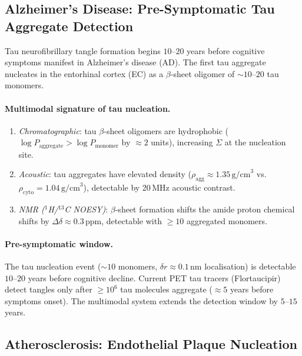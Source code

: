 \subsection{Alzheimer's Disease: Pre-Symptomatic Tau Aggregate Detection}
\label{sec:ch06-alzheimer-detection}

Tau neurofibrillary tangle formation begins $10$--$20$ years before cognitive
symptoms manifest in Alzheimer's disease (AD).  The first tau aggregate
nucleates in the entorhinal cortex (EC) as a $\beta$-sheet oligomer of
$\sim 10$--$20$ tau monomers.

\paragraph{Multimodal signature of tau nucleation.}
\begin{enumerate}[label=(\arabic*),leftmargin=2em]
  \item \emph{Chromatographic}: tau $\beta$-sheet oligomers are hydrophobic
    ($\log P_\text{aggregate} > \log P_\text{monomer}$ by $\approx 2$ units),
    increasing $\Sigma$ at the nucleation site.
  \item \emph{Acoustic}: tau aggregates have elevated density
    ($\rho_\text{agg} \approx 1.35\,\text{g/cm}^3$ vs.\ $\rho_\text{cyto}
    = 1.04\,\text{g/cm}^3$), detectable by 20\,MHz acoustic contrast.
  \item \emph{NMR ($^1$H/$^{13}$C NOESY)}: $\beta$-sheet formation shifts the
    amide proton chemical shifts by $\Delta\delta \approx 0.3\,\text{ppm}$,
    detectable with $\ge 10$ aggregated monomers.
\end{enumerate}

\paragraph{Pre-symptomatic window.}
The tau nucleation event ($\sim 10$ monomers, $\delta r \approx 0.1\,\text{nm}$
localisation) is detectable $10$--$20$ years before cognitive decline.  Current
PET tau tracers (Flortaucipir) detect tangles only after $\ge 10^6$ tau
molecules aggregate ($\approx 5$ years before symptoms onset).  The multimodal
system extends the detection window by $5$--$15$ years.

\subsection{Atherosclerosis: Endothelial Plaque Nucleation}
\label{sec:ch06-atherosclerosis-detection}

